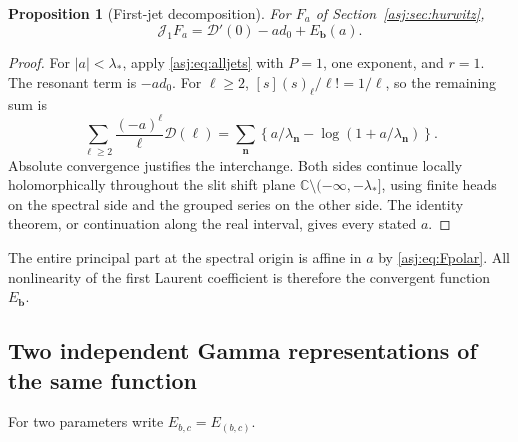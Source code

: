 \documentclass[11pt]{article}
\numberwithin{equation}{section}
\newtheorem{proposition}[theorem]{Proposition}
\theoremstyle{definition}\newtheorem{definition}[theorem]{Definition}
\theoremstyle{remark}\newtheorem{remark}[theorem]{Remark}\newtheorem{example}[theorem]{Example}
\newcommand{\C}{\mathbb C}\newcommand{\N}{\mathbb N}\newcommand{\Z}{\mathbb Z}
\newcommand{\D}{\mathscr D}\newcommand{\calH}{\mathcal H}\newcommand{\calR}{\mathcal R}
\newcommand{\calJ}{\mathcal J}\newcommand{\calZ}{\mathcal Z}
\begin{document}
\begin{proposition}[First-jet decomposition]\label{asj:thm:firstjet}
For $F_a$ of Section~\ref{asj:sec:hurwitz},
\begin{equation}\label{asj:eq:firstjet}
 \boxed{\displaystyle \calJ_1F_a=\D'(0)-a d_0+E_{\boldsymbol b}(a).}
\end{equation}
\end{proposition}
\begin{proof}
For $|a|<\lambda_*$, apply \eqref{asj:eq:alljets} with $P=1$, one exponent,
and $r=1$. The resonant term is $-a d_0$. For $\ell\ge2$,
$[s](s)_\ell/\ell!=1/\ell$, so the remaining sum is
\[
 \sum_{\ell\ge2}\frac{(-a)^\ell}{\ell}\D(\ell)
       =\sum_{\boldsymbol n}\left\{a/\lambda_{\boldsymbol n}
                  -\log(1+a/\lambda_{\boldsymbol n})\right\}.
\]
Absolute convergence justifies the interchange. Both sides continue
locally holomorphically throughout the slit shift plane
$\C\setminus(-\infty,-\lambda_*]$, using finite heads on the spectral
side and the grouped series on the other side. The identity theorem,
or continuation along the real interval, gives every stated $a$.
\end{proof}

The entire principal part at the spectral origin is affine in $a$ by
\eqref{asj:eq:Fpolar}. All nonlinearity of the first Laurent coefficient is
therefore the convergent function $E_{\boldsymbol b}$.

\subsection{Two independent Gamma representations of the same function}
For two parameters write $E_{b,c}=E_{(b,c)}$.
\end{document}
